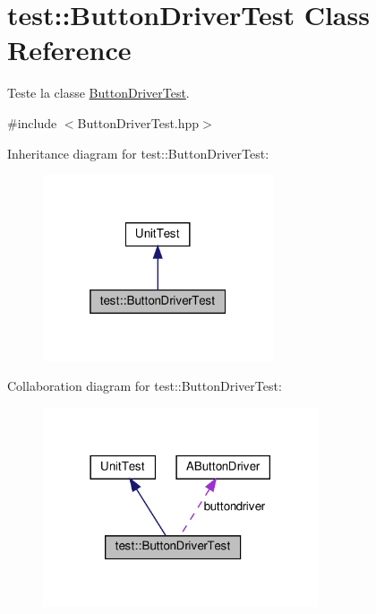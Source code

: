 \hypertarget{classtest_1_1ButtonDriverTest}{}\section{test\+:\+:Button\+Driver\+Test Class Reference}
\label{classtest_1_1ButtonDriverTest}


Teste la classe \hyperlink{classtest_1_1ButtonDriverTest}{Button\+Driver\+Test}.  




{\ttfamily \#include $<$Button\+Driver\+Test.\+hpp$>$}



Inheritance diagram for test\+:\+:Button\+Driver\+Test\+:
\nopagebreak
\begin{figure}[H]
\begin{center}
\leavevmode
\includegraphics[width=193pt]{classtest_1_1ButtonDriverTest__inherit__graph}
\end{center}
\end{figure}


Collaboration diagram for test\+:\+:Button\+Driver\+Test\+:
\nopagebreak
\begin{figure}[H]
\begin{center}
\leavevmode
\includegraphics[width=230pt]{classtest_1_1ButtonDriverTest__coll__graph}
\end{center}
\end{figure}
